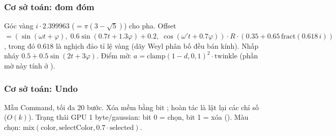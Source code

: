 \subsubsection{Cơ sở toán: đom đóm}\label{s:math-firefly}
Góc vàng $i\cdot2.399963$ ($=\pi(3-\sqrt5)$) cho pha. Offset $=(\sin(\omega t+\varphi),\;0.6\sin(0.7t+1.3\varphi)+0.2,\;\cos(\omega't+0.7\varphi))\cdot R\cdot(0.35+0.65\,\mathrm{fract}(0.618\,i))$, trong đó $0.618$ là nghịch đảo tỉ lệ vàng (dãy Weyl phân bố đều bán kính). Nhấp nháy $0.5+0.5\sin(2t+3\varphi)$. Điểm mờ: $a=\mathrm{clamp}(1-d,0,1)^2\cdot\mathrm{twinkle}$ (phần mờ này tính ở ).
\subsubsection{Cơ sở toán: Undo}\label{s:math-undo}
Mẫu Command, tối đa 20 bước. Xóa mềm bằng bit ; hoàn tác là lật lại các chỉ số ($O(k)$). Trạng thái GPU 1 byte/gaussian: bit 0 = chọn, bit 1 = xóa (). Màu chọn: $\mathrm{mix}(\mathrm{color},\mathrm{selectColor},0.7\cdot\mathrm{selected})$.
